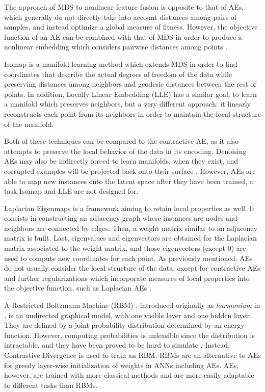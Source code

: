The approach of MDS to nonlinear feature fusion is opposite to that of AEs, which generally do not directly take into account distances among pairs of samples, and instead optimize a global measure of fitness. However, the objective function of an AE can be combined with that of MDS in order to produce a nonlinear embedding which considers pairwise distances among points .

Isomap  is a manifold learning method which extends MDS in order to find coordinates that describe the actual degrees of freedom of the data while preserving distances among neighbors and geodesic distances between the rest of points. In addition, Locally Linear Embedding (LLE)  has a similar goal, to learn a manifold which preserves neighbors, but a very different approach: it linearly reconstructs each point from its neighbors in order to maintain the local structure of the manifold.

Both of these techniques can be compared to the contractive AE, as it also attempts to preserve the local behavior of the data in its encoding. Denoising AEs may also be indirectly forced to learn manifolds, when they exist, and corrupted examples will be projected back onto their surface . However, AEs are able to map new instances onto the latent space after they have been trained, a task Isomap and LLE are not designed for.

Laplacian Eigenmaps  is a framework aiming to retain local properties as well. It consists in constructing an adjacency graph where instances are nodes and neighbors are connected by edges. Then, a weight matrix similar to an adjacency matrix is built. Last, eigenvalues and eigenvectors are obtained for the Laplacian matrix associated to the weight matrix, and those eigenvectors (except 0) are used to compute new coordinates for each point. As previously mentioned, AEs do not usually consider the local structure of the data, except for contractive AEs and further regularizations which incorporate measures of local properties into the objective function, such as Laplacian AEs .

A Restricted Boltzmann Machine (RBM) , introduced originally as \textit{harmonium} in , is an undirected graphical model, with one visible layer and one hidden layer. They are defined by a joint probability distribution determined by an energy function.
However, computing probabilities is unfeasible since the distribution is intractable, and they have been proved to be hard to simulate . Instead, Contrastive Divergence  is used to train an RBM. RBMs are an alternative to AEs for greedy layer-wise initialization of weights in ANNs including AEs. AEs, however, are trained with more classical methods and are more easily adaptable to different tasks than RBMs.

